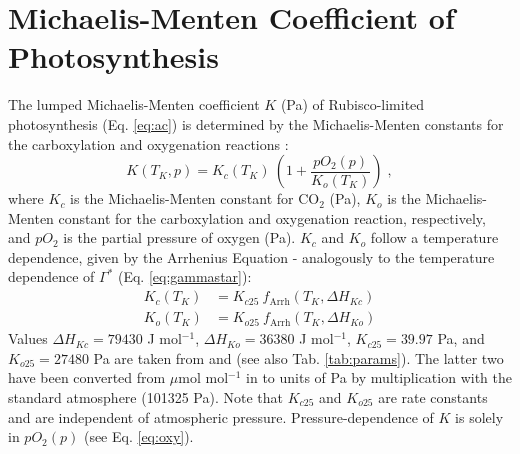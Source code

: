 \documentclass[gmd, manuscript]{copernicus}
\begin{document}
\section{Michaelis-Menten Coefficient of Photosynthesis}
\label{sec:kmm}
The lumped Michaelis-Menten coefficient $K$ (Pa) of Rubisco-limited photosynthesis (Eq. \ref{eq:ac}) is determined by the Michaelis-Menten constants for the carboxylation and oxygenation reactions \citep{farquhar80}:
\begin{equation}
\label{eq:michaelis}
  K(T_K, p) = K_c(T_K)\: \left( 1 + \frac{pO_2(p)}{K_o(T_K)} \right) \;,
\end{equation}
where $K_c$ is the Michaelis-Menten constant for CO$_2$ (Pa), $K_o$ is the Michaelis-Menten constant for the carboxylation and oxygenation reaction, respectively, and $pO_2$ is the partial pressure of oxygen (Pa). $K_c$ and $K_o$ follow a temperature dependence, given by the Arrhenius Equation - analogously to the temperature dependence of $\Gamma^\ast$ (Eq. \ref{eq:gammastar}):
\begin{subequations}
\label{eq:kcko}
\begin{align}
  K_c(T_K)& = K_{c25}\: f_{\text{Arrh}}(T_K, \Delta H_{Kc}) \label{eq:kc} \\
    K_o(T_K)& = K_{o25}\: f_{\text{Arrh}}(T_K, \Delta H_{Ko}) \label{eq:ko}
\end{align}
\end{subequations}
Values $\Delta H_{Kc} = 79430$ J mol$^{-1}$, $\Delta H_{Ko} = 36380$ J mol$^{-1}$, $K_{c25} = 39.97$ Pa, and $K_{o25} = 27480$ Pa are taken from \citet{bernacchi01} and (see also Tab. \ref{tab:params}). The latter two have been converted from $\mu$mol mol$^{-1}$ in \citet{bernacchi01} to units of Pa by multiplication with the standard atmosphere (101325 Pa). Note that $K_{c25}$ and $K_{o25}$ are rate constants and are independent of atmospheric pressure. Pressure-dependence of $K$ is solely in $pO_2(p)$ (see Eq. \ref{eq:oxy}).

\end{document}
